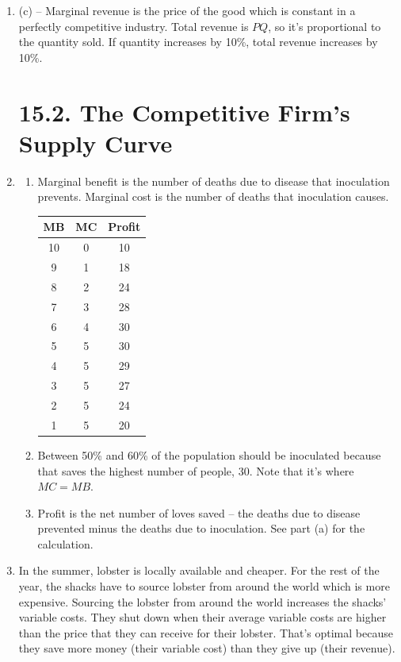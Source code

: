 \documentclass{article}
\begin{document}
\begin{enumerate}
\begin{enumerate}
	\end{enumerate}
	
\item (c) -- Marginal revenue is the price of the good which is constant in a perfectly competitive industry. Total revenue is $PQ$, so it's proportional to the quantity sold. If quantity increases by 10\%, total revenue increases by 10\%.

\section*{15.2. The Competitive Firm's Supply Curve}

\item

	\begin{enumerate}

	\item Marginal benefit is the number of deaths due to disease that inoculation prevents. Marginal cost is the number of deaths that inoculation causes. 
	
		\begin{center}
		\begin{tabular}{c | c | c }
		MB & MC & Profit \\
		\hline
		10 & 0 & 10 \\
		9 & 1 & 18 \\
		8 & 2 & 24 \\
		7 & 3 & 28 \\
		6 & 4 & 30 \\
		5 & 5 & 30 \\
		4 & 5 & 29 \\
		3 & 5 & 27 \\
		2 & 5 & 24 \\
		1 & 5 & 20
		\end{tabular}
		\end{center}
		
	\item Between 50\% and 60\% of the population should be inoculated because that saves the highest number of people, 30. Note that it's where $MC = MB$.
	
	\item Profit is the net number of loves saved -- the deaths due to disease prevented minus the deaths due to inoculation. See part (a) for the calculation.
		
	\end{enumerate}
	
\item In the summer, lobster is locally available and cheaper. For the rest of the year, the shacks have to source lobster from around the world which is more expensive. Sourcing the lobster from around the world increases the shacks' variable costs. They shut down when their average variable costs are higher than the price that they can receive for their lobster. That's optimal because they save more money (their variable cost) than they give up (their revenue). 


\end{enumerate}
\end{document}
